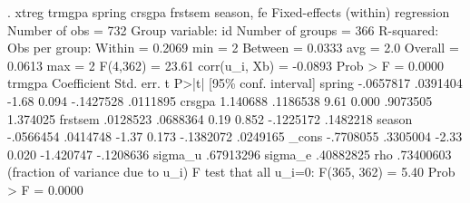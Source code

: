 . xtreg trmgpa spring crsgpa frstsem season, fe
{\smallskip}
Fixed-effects (within) regression               Number of obs     =        732
Group variable: id                              Number of groups  =        366
{\smallskip}
R-squared:                                      Obs per group:
     Within  = 0.2069                                         min =          2
     Between = 0.0333                                         avg =        2.0
     Overall = 0.0613                                         max =          2
{\smallskip}
                                                F(4,362)          =      23.61
corr(u_i, Xb) = -0.0893                         Prob > F          =     0.0000
{\smallskip}
      trmgpa {\VBAR} Coefficient  Std. err.      t    P>|t|     [95\% conf. interval]
      spring {\VBAR}  -.0657817   .0391404    -1.68   0.094    -.1427528    .0111895
      crsgpa {\VBAR}   1.140688   .1186538     9.61   0.000     .9073505    1.374025
     frstsem {\VBAR}   .0128523   .0688364     0.19   0.852    -.1225172    .1482218
      season {\VBAR}  -.0566454   .0414748    -1.37   0.173    -.1382072    .0249165
       _cons {\VBAR}  -.7708055   .3305004    -2.33   0.020    -1.420747   -.1208636
     sigma_u {\VBAR}  .67913296
     sigma_e {\VBAR}  .40882825
         rho {\VBAR}  .73400603   (fraction of variance due to u_i)
F test that all u_i=0: F(365, 362) = 5.40                    Prob > F = 0.0000
{\smallskip}
